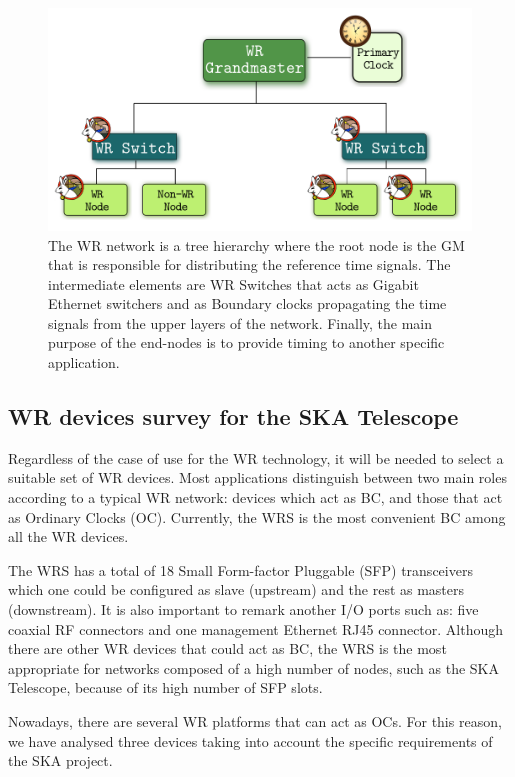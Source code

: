 \begin{figure}[H] \centering \includegraphics[scale=0.4]{img/wr_hierarchy}
	\caption{The WR network is a tree hierarchy where the root node is the
	GM that is responsible for distributing the reference time signals. The
	intermediate elements are WR Switches that acts as Gigabit Ethernet
	switchers and as Boundary clocks propagating the time signals from the
	upper layers of the network. Finally, the main purpose of the end-nodes
	is to provide timing to another specific application.}
\label{fig:wr_hierarchy} \end{figure}

\subsection{WR devices survey for the SKA Telescope} \label{subsec:wr-dev}

Regardless of the case of use for the WR technology, it will be needed to select
a suitable set of WR devices. Most applications distinguish between two main roles
according to a typical WR network: devices which act as BC, and those that act as
Ordinary Clocks (OC). Currently, the WRS \cite{ohwr:wrs} is the most convenient
BC among all the WR devices. 

The WRS has a total of 18 Small Form-factor Pluggable (SFP) transceivers which one could be configured as slave
(upstream) and the rest as masters (downstream). It is also important to remark
another I/O ports such as: five coaxial RF connectors and one management
Ethernet RJ45 connector. Although there are other WR devices that could act as
BC, the WRS is the most appropriate for networks composed of a high number of nodes,
such as the SKA Telescope, because of its high number of SFP slots.

Nowadays, there  are several WR platforms that can act as OCs. 
For this reason, we have analysed three devices taking into account the specific requirements of the SKA project.


